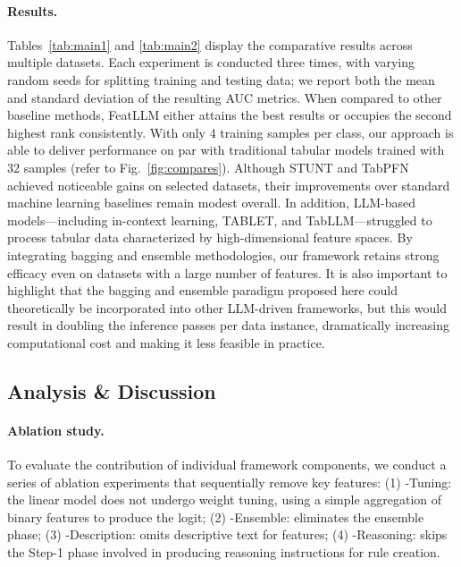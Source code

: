 \vspace*{-0.12in}
\paragraph{Results.}
Tables~\ref{tab:main1} and \ref{tab:main2} display the comparative results across multiple datasets. Each experiment is conducted three times, with varying random seeds for splitting training and testing data; we report both the mean and standard deviation of the resulting AUC metrics. When compared to other baseline methods, \textsf{FeatLLM} either attains the best results or occupies the second highest rank consistently. With only 4 training samples per class, our approach is able to deliver performance on par with traditional tabular models trained with 32 samples (refer to Fig.~\ref{fig:compares}). Although STUNT and TabPFN achieved noticeable gains on selected datasets, their improvements over standard machine learning baselines remain modest overall. In addition, LLM-based models—including in-context learning, TABLET, and TabLLM—struggled to process tabular data characterized by high-dimensional feature spaces. By integrating bagging and ensemble methodologies, our framework retains strong efficacy even on datasets with a large number of features. It is also important to highlight that the bagging and ensemble paradigm proposed here could theoretically be incorporated into other LLM-driven frameworks, but this would result in doubling the inference passes per data instance, dramatically increasing computational cost and making it less feasible in practice.

\subsection{Analysis \& Discussion}
\label{sec:analysis}
\paragraph{Ablation study.} To evaluate the contribution of individual framework components, we conduct a series of ablation experiments that sequentially remove key features: (1) \textsf{-Tuning}: the linear model does not undergo weight tuning, using a simple aggregation of binary features to produce the logit; (2) \textsf{-Ensemble}: eliminates the ensemble phase; (3) \textsf{-Description}: omits descriptive text for features; (4) \textsf{-Reasoning}: skips the Step-1 phase involved in producing reasoning instructions for rule creation.

